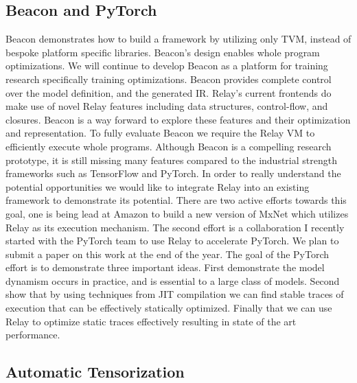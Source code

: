 \subsection{Beacon and PyTorch}

Beacon demonstrates how to build a framework
    by utilizing only TVM, instead of bespoke
    platform specific libraries.
Beacon's design enables whole program optimizations.
We will continue to develop Beacon as a platform for training
    research specifically training optimizations.
Beacon provides complete control over the model definition, and the generated IR.
Relay's current frontends do make use of novel Relay
    features including data structures, control-flow, and
    closures.
Beacon is a way forward to explore these features and their optimization
    and representation.
To fully evaluate Beacon we require the Relay VM to efficiently
    execute whole programs.
Although Beacon is a compelling research prototype, it is still missing many
    features compared to the industrial strength frameworks such as TensorFlow and PyTorch.
In order to really understand the potential opportunities we would like to integrate
    Relay into an existing framework to demonstrate its potential.
There are two active efforts towards this goal, one is being lead at Amazon
    to build a new version of MxNet which utilizes Relay as its execution
    mechanism.
The second effort is a collaboration I recently started with
    the PyTorch team to use Relay to accelerate PyTorch.
We plan to submit a paper on this work at the end of the year.
The goal of the PyTorch effort is to demonstrate three important
    ideas.
First demonstrate the model dynamism occurs in practice, and is
    essential to a large class of models.
Second show that by using techniques from JIT compilation we
    can find stable traces of execution that can be effectively
    statically optimized.
Finally that we can use Relay to optimize static traces effectively
    resulting in state of the art performance.

\subsection{Automatic Tensorization}

